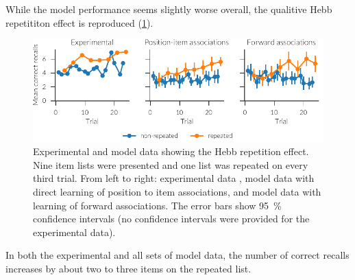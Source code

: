 While the model performance seems slightly worse overall, the qualitive Hebb repetititon effect is reproduced (\cref{fig:hebb}).
\begin{figure}
    \centering
    \includegraphics{figures/hebb}
    \caption[Hebb repetition effect.]{Experimental and model data showing the Hebb repetition effect. Nine item lists were presented and one list was repeated on every third trial. From left to right: experimental data \parencite{Hebb1961}, model data with direct learning of position to item associations, and model data with learning of forward associations. The error bars show \SI{95}{\percent} confidence intervals (no confidence intervals were provided for the experimental data).}\label{fig:hebb}
\end{figure}
In both the experimental and all sets of model data, the number of correct recalls increases by about two to three items on the repeated list.


